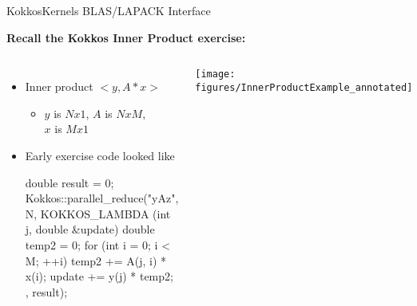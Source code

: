 \begin{frame}[fragile]{KokkosKernels BLAS/LAPACK Interface}

\textbf {Recall the Kokkos Inner Product exercise:}

\begin{columns}[t,onlytextwidth]
\begin{itemize}
  \item Inner product $<y,A*x>$
  \begin{itemize}
    \item $y$ is $Nx1$, $A$ is $NxM$,\\ $x$ is $Mx1$
  \end{itemize}
  \item Early exercise code looked like

  \begin{code}[keywords={double,parallel_reduce,for,int}]
double result = 0;
Kokkos::parallel_reduce("yAz", N,
    KOKKOS_LAMBDA (int j, double &update) {
      double temp2 = 0;
      for (int i = 0; i < M; ++i) {
        temp2 += A(j, i) * x(i);
      }
      update += y(j) * temp2;
  }, result);
  \end{code}

\end{itemize}

  \begin{flushright}
    \texttt{[image: figures/InnerProductExample\_annotated]}
  \end{flushright}
\end{columns}
\end{frame}


